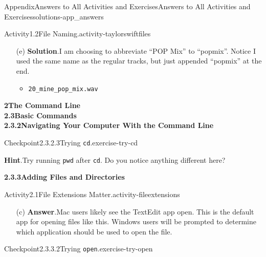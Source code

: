 \documentclass[twoside,10pt,]{book}
\newcommand{\blocktitlefont}{\relax}
\newcommand{\mono}[1]{\texttt{#1}}
\begin{document}
\begin{solutions-chapter}{Appendix}{Answers to All Activities and Exercises}{}{Answers to All Activities and Exercises}{}{}{solutions-app_answers}
\begin{activitysolution}{Activity}{1.2}{File Naming.}{activity-taylorswiftfiles}
\begin{enumerate}[font=\bfseries,label=(\alph*),ref=\alph*]
\begin{itemize}[label=\textbullet]
\item{}\mono{18\_back\_to\_dec\_acoust.wav}%
\item{}\mono{19\_haunted\_acoust.wav}%
\end{itemize}
%
\item[(e)]\noindent\textbf{\blocktitlefont Solution}.\hypertarget{solution-taylorswiftfiles-h-b-back}{}\quad{}I am choosing to abbreviate ``POP Mix'' to ``pop\textunderscore{}mix''. Notice I used the same name as the regular tracks, but just appended ``\textunderscore{}pop\textunderscore{}mix'' at the end.%
\begin{itemize}[label=\textbullet]
\item{}\mono{20\_mine\_pop\_mix.wav}%
\end{itemize}
%
\end{enumerate}%
\end{activitysolution}%
\par\medskip
\noindent\textbf{\Large{}2\space\textperiodcentered\space{}The Command Line\\
2.3\space\textperiodcentered\space{}Basic Commands\\
2.3.2\space\textperiodcentered\space{}Navigating Your Computer With the Command Line}
\begin{inlinesolution}{Checkpoint}{2.3.2.3}{Trying \mono{cd}.}{exercise-try-cd}%
\par\smallskip%
\noindent\textbf{\blocktitlefont Hint}.\hypertarget{hint-try-cd-c-back}{}\quad{}Try running \mono{pwd} after \mono{cd}. Do you notice anything different here?%
\end{inlinesolution}%
\par\medskip
\noindent\textbf{\Large{}2.3.3\space\textperiodcentered\space{}Adding Files and Directories}
\begin{activitysolution}{Activity}{2.1}{File Extensions Matter.}{activity-fileextensions}%
\begin{enumerate}[font=\bfseries,label=(\alph*),ref=\alph*]%
\item[(c)]\noindent\textbf{\blocktitlefont Answer}.\hypertarget{answer-fileextensions-g-b-back}{}\quad{}Mac users likely see the TextEdit app open. This is the default app for opening files like this. Windows users will be prompted to determine which application should be used to open the file.%
\end{enumerate}%
\end{activitysolution}%
\begin{inlinesolution}{Checkpoint}{2.3.3.2}{Trying \mono{open}.}{exercise-try-open}%

\end{inlinesolution}
\end{solutions-chapter}
\end{document}
